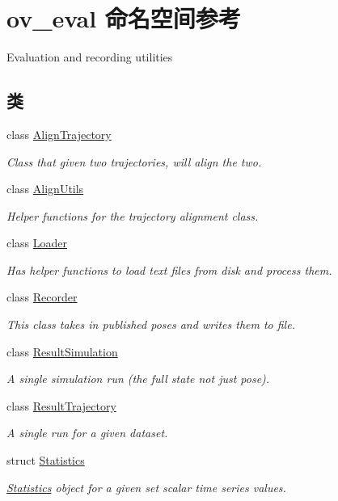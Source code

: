 \hypertarget{namespaceov__eval}{}\section{ov\+\_\+eval 命名空间参考}
\label{namespaceov__eval}


Evaluation and recording utilities  


\subsection*{类}
\begin{DoxyCompactItemize}
\item 
class \hyperlink{classov__eval_1_1AlignTrajectory}{Align\+Trajectory}
\begin{DoxyCompactList}\small\item\em Class that given two trajectories, will align the two. \end{DoxyCompactList}\item 
class \hyperlink{classov__eval_1_1AlignUtils}{Align\+Utils}
\begin{DoxyCompactList}\small\item\em Helper functions for the trajectory alignment class. \end{DoxyCompactList}\item 
class \hyperlink{classov__eval_1_1Loader}{Loader}
\begin{DoxyCompactList}\small\item\em Has helper functions to load text files from disk and process them. \end{DoxyCompactList}\item 
class \hyperlink{classov__eval_1_1Recorder}{Recorder}
\begin{DoxyCompactList}\small\item\em This class takes in published poses and writes them to file. \end{DoxyCompactList}\item 
class \hyperlink{classov__eval_1_1ResultSimulation}{Result\+Simulation}
\begin{DoxyCompactList}\small\item\em A single simulation run (the full state not just pose). \end{DoxyCompactList}\item 
class \hyperlink{classov__eval_1_1ResultTrajectory}{Result\+Trajectory}
\begin{DoxyCompactList}\small\item\em A single run for a given dataset. \end{DoxyCompactList}\item 
struct \hyperlink{structov__eval_1_1Statistics}{Statistics}
\begin{DoxyCompactList}\small\item\em \hyperlink{structov__eval_1_1Statistics}{Statistics} object for a given set scalar time series values. \end{DoxyCompactList}\end{DoxyCompactItemize}


